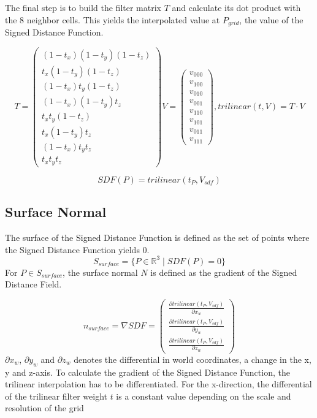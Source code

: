 \documentclass[12pt]{article}
\newcommand{\pardiff}[2]{\frac{\partial #1}{\partial #2} }
\newcommand{\newlinell}{\\[0.6em]}
\begin{document}
The final step is to build the filter matrix $T$ and calculate its dot product with the 8 neighbor cells. This yields the interpolated value at $P_{grid}$, the value of the Signed Distance Function.

\begin{equation}
T =
\begin{pmatrix}
(1 - t_x) (1 - t_y) (1 - t_z) \\
t_x (1 - t_y) (1 - t_z) \\
(1 - t_x) t_y (1 - t_z) \\
(1 - t_x) (1 - t_y) t_z \\
t_x t_y (1 - t_z) \\
t_x (1 - t_y) t_z \\
(1 - t_x) t_y t_z \\
t_x t_y t_z
\end{pmatrix}	
V =
\begin{pmatrix}
v_{000} \\
v_{100} \\
v_{010} \\
v_{001} \\
v_{110} \\
v_{101} \\
v_{011} \\
v_{111} 
\end{pmatrix}
, trilinear(t, V) = T \cdot V
\end{equation}

\begin{equation}
SDF(P) = trilinear(t_P, V_{sdf})
\end{equation}

\subsection{Surface Normal}

The surface of the Signed Distance Function is defined as the set of points where the Signed Distance Function yields 0.
\begin{equation}
S_{surface} = \{P \in \mathbb{R}^3 \mid SDF(P) = 0\}
\end{equation}
For $P \in S_{surface}$, the surface normal $N$ is defined as the gradient of the Signed Distance Field.

\begin{equation}
n_{surface} = \nabla SDF = 
\begin{pmatrix}
\pardiff{trilinear(t_P, V_{sdf})}{x_{w}} \newlinell
\pardiff{trilinear(t_P, V_{sdf})}{y_{w}} \newlinell
\pardiff{trilinear(t_P, V_{sdf})}{z_{w}}
\end{pmatrix}
\end{equation}
$\partial x_{w}$, $\partial y_{w}$ and $\partial z_{w}$ denotes the differential in world coordinates, a change in the x, y and z-axis. To calculate the gradient of the Signed Distance Function, the trilinear interpolation has to be differentiated. For the x-direction, the differential of the trilinear filter weight $t$ is a constant value depending on the scale and resolution of the grid
\end{document}
